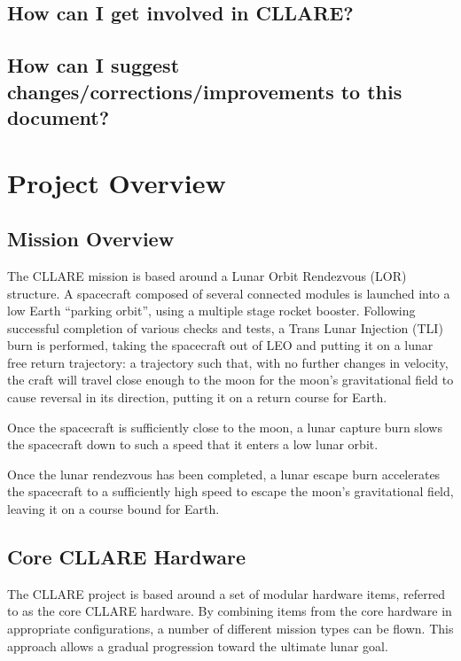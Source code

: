 \documentclass{report}
\begin{document}
\section{How can I get involved in CLLARE?}

\section{How can I suggest changes/corrections/improvements to this document?}


\chapter{Project Overview}

\section{Mission Overview}

The CLLARE mission is based around a Lunar Orbit Rendezvous (LOR) structure.  A spacecraft composed of several connected modules is launched into a low Earth ``parking orbit'', using a multiple stage rocket booster.  Following successful completion of various checks and tests, a Trans Lunar Injection (TLI) burn is performed, taking the spacecraft out of LEO and putting it on a lunar free return trajectory: a trajectory such that, with no further changes in velocity, the craft will travel close enough to the moon for the moon's gravitational field to cause reversal in its direction, putting it on a return course for Earth.

Once the spacecraft is sufficiently close to the moon, a lunar capture burn slows the spacecraft down to such a speed that it enters a low lunar orbit.

Once the lunar rendezvous has been completed, a lunar escape burn accelerates the spacecraft to a sufficiently high speed to escape the moon's gravitational field, leaving it on a course bound for Earth.

\section{Core CLLARE Hardware}

The CLLARE project is based around a set of modular hardware items, referred to as the core CLLARE hardware.  By combining items from the core hardware in appropriate configurations, a number of different mission types can be flown.  This approach allows a gradual progression toward the ultimate lunar goal.
\end{document}
